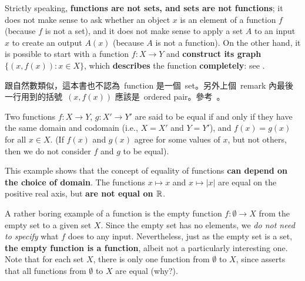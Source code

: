\begin{remark} \label{remark 3.3.6}
Strictly speaking, \textbf{functions are not sets, and sets are not functions}; it does not make sense to ask whether an object \(x\) is an element of a function \(f\)(because \(f\) is not a set), and it does not make sense to apply a set \(A\) to an input \(x\) to create an output \(A(x)\) (because \(A\) is not a function). On the other hand, it is possible to start with a function \(f : X \rightarrow Y\) and \textbf{construct its graph} \(\{(x, f(x)) : x \in X\}\), which \textbf{describes} the function \textbf{completely}: see .
\end{remark}

\begin{note}
跟自然數類似，這本書也不認為\ function 是一個\ set。另外上個\ remark 內最後一行用到的括號\ \((x, f(x))\) 應該是\ ordered pair。參考\ 。
\end{note}

\begin{definition}  \label{def 3.3.7}
Two functions \(f: X \rightarrow Y\), \(g: X' \rightarrow Y'\) are said to be equal if and only if they have the same domain and codomain (i.e., \(X = X'\) and \(Y = Y'\)), and \(f(x) = g(x)\) for all \(x \in X\). (If \(f(x)\) and \(g(x)\) agree for some values of \(x\), but not others, then we do not consider \(f\) and \(g\) to be equal).
\end{definition}

\begin{example} \label{example 3.8.8}
This example shows that the concept of equality of functions \textbf{can depend on the choice of domain}. The functions \(x \mapsto x\) and \(x \mapsto |x|\) are equal on the positive real axis, but \textbf{are not equal on \(\mathbb{R}\)}.
\end{example}

\begin{example}
A rather boring example of a function is the empty function \(f : \emptyset \rightarrow X\) from the empty set to a given set \(X\). Since the empty set has no elements, we \emph{do not need to specify} what \(f\) does to any input. Nevertheless, just as the empty set is a set, \textbf{the empty function is a function}, albeit not a particularly interesting one. Note that for each set \(X\), there is only one function from \(\emptyset\) to \(X\), since  asserts that all functions from \(\emptyset\) to \(X\) are equal (why?).
\end{example}

